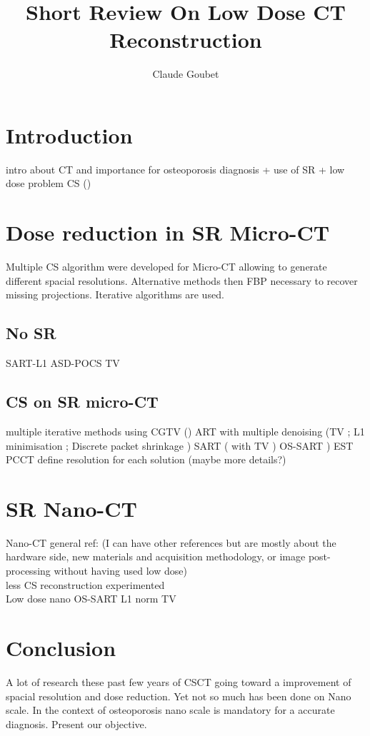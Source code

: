 \documentclass[10pt,a4paper]{article}
\author{Claude Goubet}
\title{Short Review On Low Dose CT Reconstruction}
\begin{document}
\maketitle

\section{Introduction}
	intro about CT and importance for osteoporosis diagnosis + use of SR + low dose problem CS (\cite{[24], [25], [26]})

\section{Dose reduction in SR Micro-CT}
Multiple CS algorithm were developed for Micro-CT allowing to generate different spacial resolutions. Alternative methods then FBP necessary to recover missing projections. Iterative algorithms are used.
	\subsection{No SR}
		SART-L1 \cite{[11],[13]} ASD-POCS TV \cite{[9]}
	\subsection{CS on SR micro-CT}
		multiple iterative methods using CGTV (\cite{[12]}) ART with multiple denoising (TV \cite{[3]}; L1 minimisation \cite{[18]}; Discrete packet shrinkage \cite{[2]}) SART (\cite{[1]} with TV \cite{[5]}) OS-SART \cite{[6]}) EST \cite{[15], [16]}  PCCT \cite{[8]}
		 define resolution for each solution (maybe more details?)

\section{SR Nano-CT}
	Nano-CT general ref: \cite{[23]} (I can have other references but are mostly about the hardware side, new materials and acquisition methodology, or image post-processing without having used low dose)\\
	less CS reconstruction experimented	\\
	Low dose nano OS-SART L1 norm TV \cite{[10]}

\section{Conclusion}
	A lot of research these past few years of CSCT going toward a improvement of spacial resolution and dose reduction. Yet not so much has been done on Nano scale. In the context of osteoporosis nano scale is mandatory for a accurate diagnosis. Present our objective.
	
\end{document}
